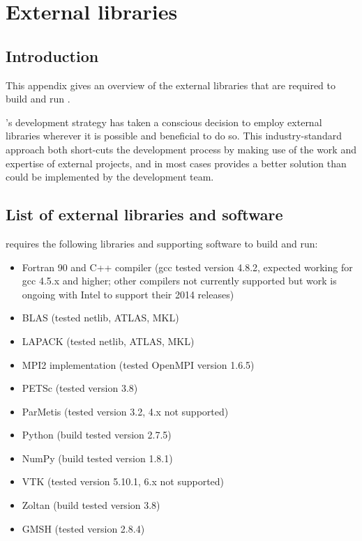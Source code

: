 \chapter{External libraries}\label{chap:external}

\section{Introduction}

This appendix gives an overview of the external libraries that are required to
build and run \fluidity.

\fluidity's development strategy has taken a conscious decision to employ
external libraries wherever it is possible and beneficial to do so. This
industry-standard approach both short-cuts the development process by making
use of the work and expertise of external projects, and in most cases provides
a better solution than could be implemented by the \fluidity development team.

\section{List of external libraries and software}
\label{sec:required_libraries_list}

\fluidity requires the following libraries and supporting software to build and
run:

\begin{itemize}
\item Fortran 90 and C++ compiler (gcc tested version 4.8.2, expected working for gcc 4.5.x and higher; other compilers not currently supported but work is ongoing with Intel to support their 2014 releases)
\item BLAS (tested netlib, ATLAS, MKL)
\item LAPACK (tested netlib, ATLAS, MKL)
\item MPI2 implementation (tested OpenMPI version 1.6.5)
\item PETSc (tested version 3.8)
\item ParMetis (tested version 3.2, 4.x not supported)
\item Python (build tested version 2.7.5) 
\item NumPy (build tested version 1.8.1)
\item VTK (tested version 5.10.1, 6.x not supported)
\item Zoltan (build tested version 3.8)
\item GMSH (tested version 2.8.4)
\end{itemize}

